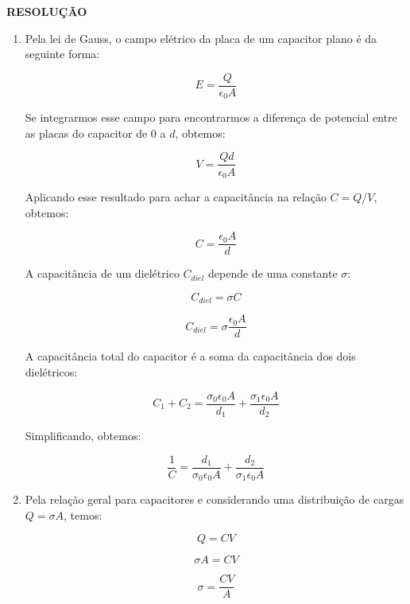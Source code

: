 \documentclass[11pt,a4paper]{article}
\begin{document}
\begin{enumerate}
\textbf{RESOLUÇÃO}

\begin{enumerate}

\item

Pela lei de Gauss, o campo elétrico da placa de um capacitor plano é da seguinte forma:

$$E = \displaystyle\dfrac{Q}{\epsilon_0 A}$$

Se integrarmos esse campo para encontrarmos a diferença de potencial entre as placas do capacitor de $0$ a $d$, obtemos:

$$V = \displaystyle\dfrac{Qd}{\epsilon_0 A}$$

Aplicando esse resultado para achar a capacitância na relação $C = Q/V$, obtemos:

$$C = \displaystyle\dfrac{\epsilon_0 A}{d}$$

A capacitância de um dielétrico $C_{diel}$ depende de uma constante $\sigma$:

$$C_{diel} = \sigma C$$

$$C_{diel} = \sigma \displaystyle\dfrac{\epsilon_0 A}{d}$$

A capacitância total do capacitor é a soma da capacitância dos dois dielétricos:

$$C_1 + C_2 = \displaystyle\dfrac{\sigma_0\epsilon_0 A}{d_1} + \displaystyle\dfrac{\sigma_1\epsilon_0 A}{d_2}$$

Simplificando, obtemos:

$$\displaystyle\dfrac{1}{C} = \displaystyle\dfrac{d_1}{\sigma_0 \epsilon_0 A} + \displaystyle\dfrac{d_2}{\sigma_1 \epsilon_0 A}$$

\item

Pela relação geral para capacitores e considerando uma distribuição de cargas $Q = \sigma A$, temos:

$$Q = C V$$

$$\sigma A = C V$$

$$\sigma = \displaystyle\dfrac{CV}{A}$$



\end{enumerate}


\end{enumerate}
	
\end{document}
